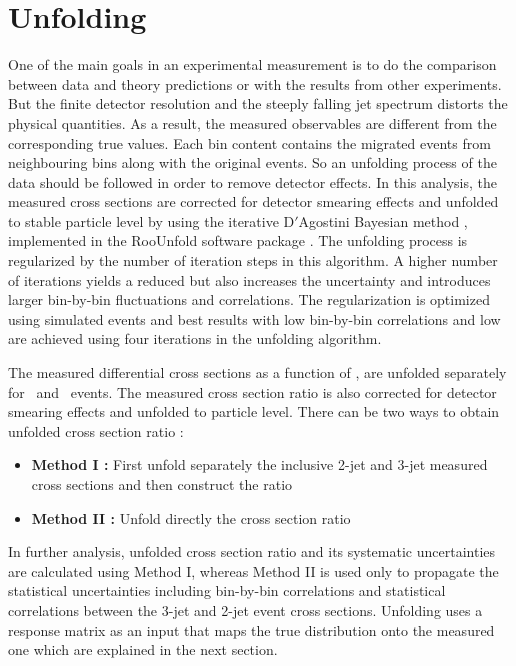 \section{Unfolding}
\label{sec:unfolding}
One of the main goals in an experimental measurement is to do the comparison between data and theory predictions or with the results from other experiments. But the finite detector resolution and the steeply falling jet \pt spectrum distorts the physical quantities. As a result, the measured observables are different from the corresponding true values. Each \pt bin content contains the migrated events from neighbouring bins along with the original events. So an unfolding process of the data should be followed in order to remove detector effects. In this analysis, the measured cross sections are corrected for detector smearing effects and unfolded to stable particle level by using the iterative D$'$Agostini Bayesian method \cite{DAgostini:1994fjx}, implemented in the RooUnfold software package \cite{Adye:2011gm}. The unfolding process is regularized by the number of iteration steps in this algorithm. A higher number of iterations yields a reduced \chisq but also increases the uncertainty and introduces larger bin-by-bin fluctuations and correlations. The regularization is optimized using simulated events and best results with low bin-by-bin correlations and low \chisq are achieved using four iterations in the unfolding algorithm.

The measured differential cross sections as a function of \httwo, are unfolded separately for \njt~and \njth~events. The measured cross section ratio \ratio is also corrected for detector smearing effects and unfolded to particle level. There can be two ways to obtain  unfolded cross section ratio :

\begin{itemize}
\item {\bf Method I :} First unfold separately the inclusive 2-jet and 3-jet measured cross sections and then construct the ratio \ratio 
\item {\bf Method II :} Unfold directly the cross section ratio \ratio
\end{itemize}

In further analysis, unfolded cross section ratio \ratio and its systematic uncertainties are calculated using Method I, whereas Method II is used only to propagate the statistical uncertainties including bin-by-bin correlations and statistical correlations between the 3-jet and
2-jet  event  cross  sections. Unfolding uses a response matrix as an input that maps the true distribution onto the measured one which are explained in the next section.

